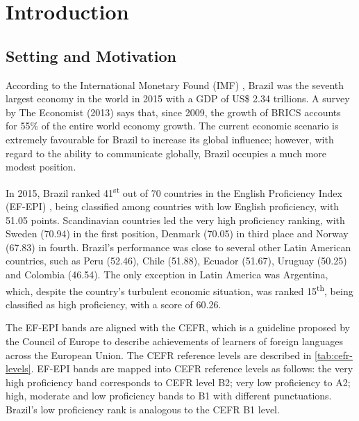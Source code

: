 \chapter{Introduction}\label{ch:introduction}

\section*{Setting and Motivation}

According to the International Monetary Found (IMF) \cite{IMF2015}, Brazil was the seventh largest economy in the world in 2015 with a GDP of US\$ 2.34 trillions. A survey by The Economist (2013) says that, since 2009, the growth of BRICS accounts for 55\% of the entire world economy growth. The current economic scenario is extremely favourable for Brazil to increase its global influence; however, with regard to the ability to communicate globally, Brazil occupies a much more modest position. 

In 2015, Brazil ranked 41\textsuperscript{st} out of 70 countries in the English Proficiency Index (EF-EPI) \cite{EF2015}, being classified among countries with low English proficiency, with 51.05 points. Scandinavian countries led the very high proficiency ranking, with Sweden (70.94) in the first position, Denmark (70.05) in third place and Norway (67.83) in fourth. Brazil's performance was close to several other Latin American countries, such as Peru (52.46), Chile (51.88), Ecuador (51.67), Uruguay (50.25) and Colombia (46.54). The only exception in Latin America was Argentina, which, despite the country's turbulent economic situation, was ranked 15\textsuperscript{th}, being classified as high proficiency, with a score of 60.26.

The \ac{EF-EPI} bands are aligned with the \ac{CEFR}, which is a guideline proposed by the Council of Europe to describe achievements of learners of foreign languages across the European Union. The \ac{CEFR} reference levels are described in \autoref{tab:cefr-levels}. \ac{EF-EPI} bands are mapped into \ac{CEFR} reference levels as follows: the very high proficiency band corresponds to \ac{CEFR} level B2; very low proficiency to A2; high, moderate and low proficiency bands to B1 with different punctuations. Brazil's low proficiency rank is analogous to the \ac{CEFR} B1 level. 

